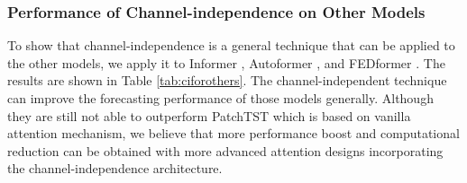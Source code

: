\documentclass{article} %
\begin{document}
\subsubsection{Performance of Channel-independence on Other Models}
\label{sec::ciforothers}

To show that channel-independence is a general technique that can be applied to the other models, we apply it to Informer \citep{informer}, Autoformer \citep{autoformer}, and FEDformer \citep{fedformer}. The results are shown in Table \ref{tab:ciforothers}. The channel-independent technique can improve the forecasting performance of those models generally. Although they are still not able to outperform PatchTST which is based on vanilla attention mechanism, we believe that more performance boost and computational reduction can be obtained with more advanced attention designs incorporating the channel-independence architecture. 
\end{document}
